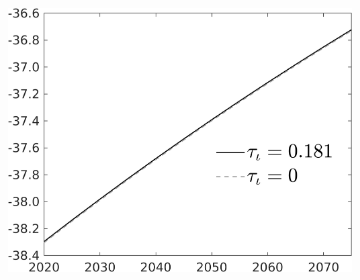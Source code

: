 \begin{figure}[h!!]
\begin{subfigure}[]{0.4\textwidth}
\includegraphics[width=1\textwidth]{../../codding_model/own_basedOnFried/optimalPol_010922_revision/figures/all_13Sept22/PerdifNoTauf_regime5_CompTaul_F_spillover0_nsk0_xgr0_knspil0_sep0_LFlimit0_emsbase0_countec0_GovRev0_etaa0.79_lgd1.png}
\end{subfigure}


\end{figure}
